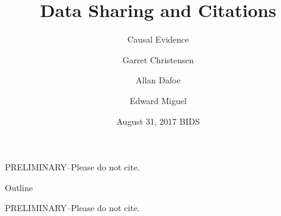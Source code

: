 \documentclass{beamer}
\title[Data Sharing and Citations] %
{Data Sharing and Citations}
\subtitle
{Causal Evidence} %
\author[Christensen, Dafoe, Miguel] %
{Garret Christensen\inst{1} \and Allan Dafoe\inst{2} \and Edward Miguel\inst{3}}
\institute[Universities of Somewhere and Elsewhere] %
{
  \inst{1}%
  Berkeley Institute for Data Science, UC Berkeley
  \and
  \inst{2}%
  Department of Political Science, Yale University
  \and
  \inst{3}%
  Department of Economics, UC Berkeley}
\date[Short Occasion] %
{August 31, 2017 BIDS}
\begin{document}
{ %
    \begin{frame}[plain]
     \end{frame}
}

\begin{frame}
  \titlepage
  \begin{center}
  \begin{large}
  PRELIMINARY--Please do not cite.
  \end{large}
  \end{center}
\end{frame}


\begin{frame}{Outline}
  \tableofcontents
  \begin{center}
  \begin{large}
  PRELIMINARY--Please do not cite.
  \end{large}
  \end{center}
\end{frame}
\end{document}
